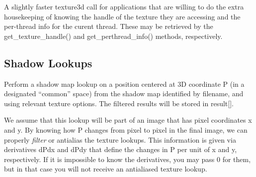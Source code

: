 \apiend

A slightly faster {\cf texture3d} call for applications that are willing
to do the extra housekeeping of knowing the handle of the texture they
are accessing and the per-thread info for the curent thread.  These
may be retrieved by the {\cf get_texture_handle()} and 
{\cf get_perthread_info()} methods, respectively.
\apiend


\subsection{Shadow Lookups}
\label{sec:texturesys:api:shadow}


Perform a shadow map lookup on a position centered at 3D
coordinate {\cf P} (in a designated ``common'' space) from the shadow map identified by
{\cf filename}, and using relevant texture {\cf options}.  The filtered
results will be stored in {\cf result[]}.

We assume that this lookup will be part of an image that has pixel
coordinates {\cf x} and {\cf y}.  By knowing how {\cf P} changes from
pixel to pixel in the final image, we can properly \emph{filter} or
antialias the texture lookups.  This information is given via
derivatives {\cf dPdx} and {\cf dPdy} that define the changes in {\cf P}
per unit of {\cf x} and {\cf y}, respectively.  If it is impossible to
know the derivatives, you may pass 0 for them, but in that case you will
not receive an antialiased texture lookup.

